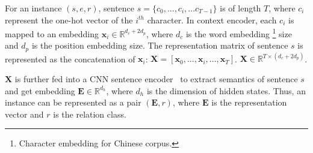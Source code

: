 For an instance $(s,e,r)$, sentence $s=\{c_0,..., c_i, ... c_{T-1}\}$ is of length $T$, where $c_i$ represent the one-hot vector of the $i^{th}$ character.
In context encoder, each $c_i$ is mapped to an embedding $\mathbf{x}_i \in \mathbb{R}^{d_c + 2 d_p}$, where $d_c$ is the word embedding \footnote{Character embedding for Chinese corpus.} size and $d_p$ is the position embedding size.
The representation matrix of sentence $s$ is represented as the concatenation of $\mathbf{x}_i$: $\mathbf{X}=[\mathbf{x}_0,..., \mathbf{x}_i, ... ,\mathbf{x}_T]$. $\mathbf{X} \in \mathbb{R}^{T\times (d_c + 2  d_p)}$.

$\mathbf{X}$ is further fed into a CNN sentence encoder~\cite{ye-ling-2019-multi} to extract semantics of sentence $s$ and get embedding $\mathbf{E} \in \mathbb{R}^{d_h}$, where $d_h$ is the dimension of hidden states.
Thus, an instance can be represented as a pair $(\mathbf{E},r)$, where $\mathbf{E}$ is the representation vector and $r$ is the relation class.



